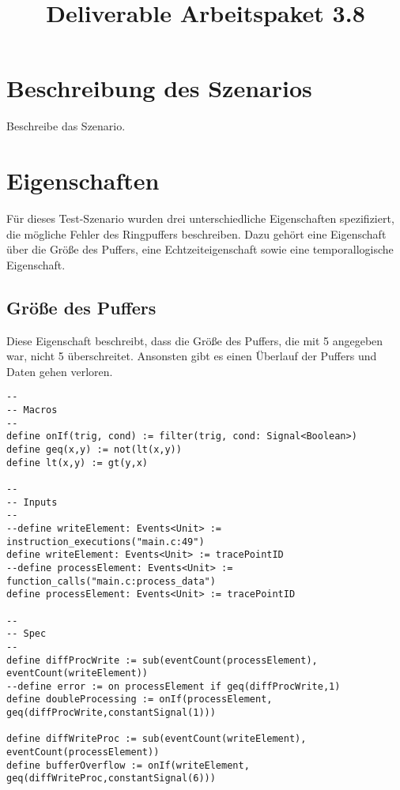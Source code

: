 \documentclass{article}
\title{Deliverable Arbeitspaket 3.8}
\title{\thetitle}
\begin{document}
\maketitle

\section{Beschreibung des Szenarios}

Beschreibe das Szenario.

\section{Eigenschaften}

Für dieses Test-Szenario wurden drei unterschiedliche Eigenschaften spezifiziert, die mögliche Fehler des Ringpuffers beschreiben. Dazu gehört eine Eigenschaft über die Größe des Puffers, eine Echtzeiteigenschaft sowie eine temporallogische Eigenschaft.

\subsection{Größe des Puffers}

Diese Eigenschaft beschreibt, dass die Größe des Puffers, die mit 5 angegeben war, nicht 5 überschreitet. Ansonsten gibt es einen Überlauf der Puffers und Daten gehen verloren.

\begin{lstlisting}[language=tessla+salt]
--
-- Macros
--
define onIf(trig, cond) := filter(trig, cond: Signal<Boolean>)
define geq(x,y) := not(lt(x,y))
define lt(x,y) := gt(y,x)

--
-- Inputs
--
--define writeElement: Events<Unit> := instruction_executions("main.c:49")
define writeElement: Events<Unit> := tracePointID
--define processElement: Events<Unit> := function_calls("main.c:process_data")
define processElement: Events<Unit> := tracePointID

--
-- Spec
--
define diffProcWrite := sub(eventCount(processElement), eventCount(writeElement))
--define error := on processElement if geq(diffProcWrite,1)
define doubleProcessing := onIf(processElement, geq(diffProcWrite,constantSignal(1)))

define diffWriteProc := sub(eventCount(writeElement), eventCount(processElement))
define bufferOverflow := onIf(writeElement, geq(diffWriteProc,constantSignal(6)))
\end{lstlisting}
\end{document}
